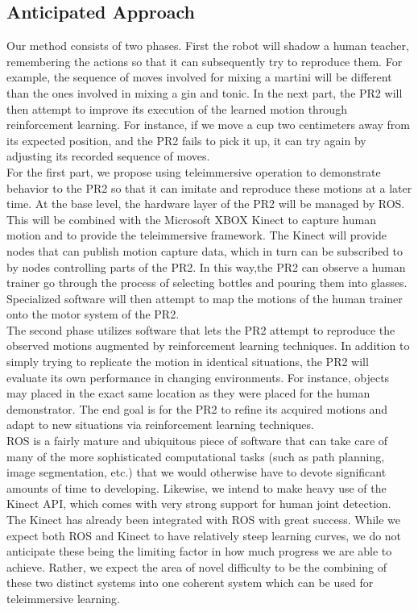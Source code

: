 \documentclass{sig-alternate}
\begin{document}
\subsection{Anticipated Approach}
\label{subsec:approach}
Our method consists of two phases. First the robot will shadow a human teacher,
remembering the actions so that it can subsequently try to reproduce them. For example,
the sequence of moves involved for mixing a martini will be different than the ones
involved in mixing a gin and tonic.
In the next part, the PR2 will then attempt to improve its execution of the learned motion through 
reinforcement learning. For instance, if we move a cup two centimeters away
from its expected position, and the PR2 fails to pick it up, it can try again 
by adjusting its recorded sequence of moves.\\
For the first part, we propose using teleimmersive operation to demonstrate
behavior to the PR2 so that it can imitate and reproduce these motions at a
later time. At the base level, the hardware layer of the PR2 will be managed 
by ROS. This will be combined with the Microsoft XBOX Kinect to capture human
motion and to provide the teleimmersive framework. The Kinect will provide nodes
that can publish motion capture data, which in turn can be subscribed to by nodes
controlling parts of the PR2.
In this way,the PR2 can observe a human trainer go
through the process of selecting bottles and pouring them into glasses. 
Specialized software will then attempt to map the motions of the human trainer
onto the motor system of the PR2.\\
The second phase utilizes software that lets the PR2 attempt to reproduce
the observed motions augmented by reinforcement learning techniques. In addition
to simply trying to replicate the motion in identical situations,
the PR2 will evaluate its own performance in changing environments. For instance, 
objects may placed in the exact same location as they were placed for the human demonstrator.
The end goal is for the PR2 to refine its acquired motions and adapt to new
situations via reinforcement learning techniques.\\
ROS is a fairly mature and ubiquitous piece of software that can take care of
many of the more sophisticated computational tasks (such as path planning, 
image segmentation, etc.) that we would otherwise have to devote significant 
amounts of time to developing.  
Likewise, we intend to make heavy use of the Kinect API, which comes with very
strong support for human joint detection. The Kinect has already been integrated with 
ROS with great success.
While we expect both ROS and Kinect to have relatively steep learning curves,
we do not anticipate these being the limiting factor in how much progress we
are able to achieve. 
Rather, we expect the area of novel difficulty to be the combining of these
two distinct systems into one coherent system which can be used for
teleimmersive learning.
\end{document}
